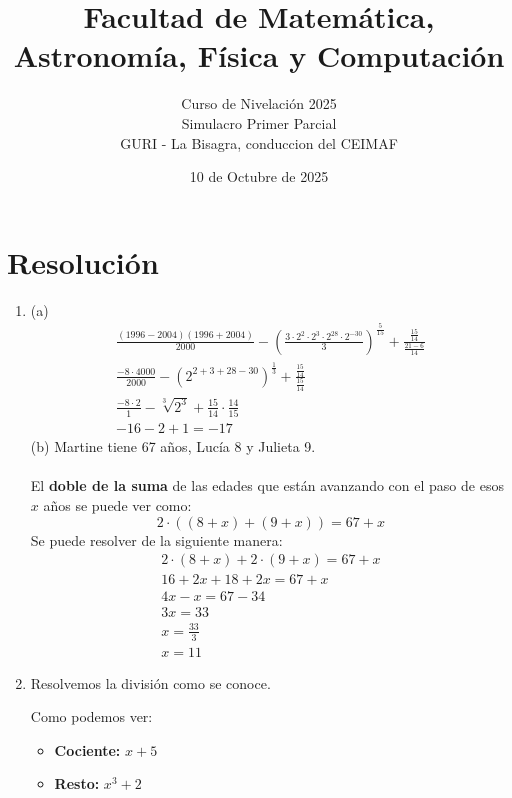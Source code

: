 \documentclass[a4paper]{article}
\title{Facultad de Matemática, Astronomía, Física y Computación}
\author{Curso de Nivelación 2025\\Simulacro Primer Parcial\\ GURI - La Bisagra, conduccion del CEIMAF}
\date{10 de Octubre de 2025}
\begin{document}
\maketitle
\section{Resolución}
\begin{enumerate}
        \item (a)
        \begin{gather*}
                \frac{(1996-2004)(1996+2004)}{2000} - \left(\frac{3\cdot 2^2\cdot 2^3 \cdot 2^{28} \cdot 2^{-30}}{3}\right)^{\frac{5}{15}}+\frac{\frac{15}{14}}{\frac{21-6}{14}}\\
                \frac{-8\cdot 4000}{2000}-\left(2^{2+3+28-30}\right)^{\frac{1}{3}}+\frac{\frac{15}{14}}{\frac{15}{14}}\\
                \frac{-8 \cdot 2}{1}-\sqrt[3]{2^{3}}+\frac{15}{14}\cdot\frac{14}{15}\\
                -16-2+1=-17
        \end{gather*}
        (b) Martine tiene 67 años, Lucía 8 y Julieta 9.\\\\
        El \textbf{doble de la suma} de las edades que están avanzando con el paso de esos $x$ años se puede ver como:
        \begin{equation*}
                2\cdot((8+x)+(9+x))=67+x
        \end{equation*}
        Se puede resolver de la siguiente manera:
        \begin{gather*}
                2\cdot(8+x)+2\cdot (9+x)=67+x\\
                16+2x+18+2x=67+x\\
                4x-x=67-34\\
                3x=33\\
                x=\frac{33}{3}\\
                x=11
        \end{gather*}
        \item Resolvemos la división como se conoce.
        \begin{center}
        \end{center}
        Como podemos ver:
        \begin{itemize}
            \item \textbf{Cociente:} $x+5$
            \item \textbf{Resto:} $x^3+2$

\end{itemize}
\end{enumerate}
\end{document}
